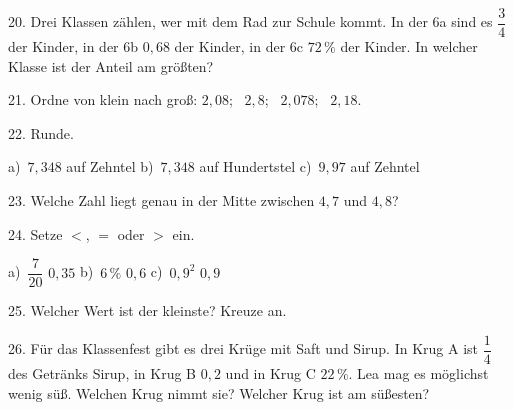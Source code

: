 \documentclass[11pt]{article}
\begin{document}
\begin{pfaufg}{}{20.}{}
Drei Klassen zählen, wer mit dem Rad zur Schule kommt. In der 6a sind es $\dfrac{3}{4}$ der Kinder, in der 6b $0{,}68$ der Kinder, in der 6c $72\,\%$ der Kinder. In welcher Klasse ist der Anteil am größten?\par\smallskip {}\par {}
\end{pfaufg}

\begin{pfaufg}{}{21.}{}
Ordne von klein nach groß: $2{,}08$; \ $2{,}8$; \ $2{,}078$; \ $2{,}18$.
\end{pfaufg}

\begin{pfaufg}{}{22.}{}
Runde.\par\vspace{3pt} a)~$7{,}348$ auf Zehntel \qquad b)~$7{,}348$ auf Hundertstel \qquad c)~$9{,}97$ auf Zehntel
\end{pfaufg}

\begin{pfaufg}{}{23.}{}
Welche Zahl liegt genau in der Mitte zwischen $4{,}7$ und $4{,}8$?
\end{pfaufg}

\begin{pfaufg}{}{24.}{}
Setze $<$, $=$ oder $>$ ein.\par\vspace{3pt} a)~$\dfrac{7}{20}$ \leerfeld $0{,}35$ \qquad b)~$6\,\%$ \leerfeld $0{,}6$ \qquad c)~$0{,}9^2$ \leerfeld $0{,}9$
\end{pfaufg}

\begin{pfaufg}{}{25.}{}
Welcher Wert ist der kleinste? Kreuze an.\par\smallskip {}\par {}
\end{pfaufg}

\begin{pfaufg}{}{26.}{}
Für das Klassenfest gibt es drei Krüge mit Saft und Sirup. In Krug A ist $\dfrac{1}{4}$ des Getränks Sirup, in Krug B $0{,}2$ und in Krug C $22\,\%$. Lea mag es möglichst wenig süß. Welchen Krug nimmt sie? Welcher Krug ist am süßesten?
\end{pfaufg}

\par\vfill{}
\end{document}
